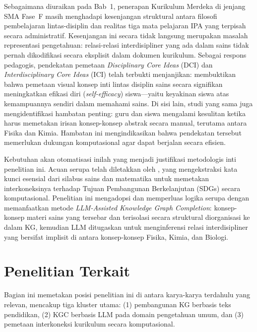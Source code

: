 \documentclass[../../thesis]{subfiles}
\begin{document}
Sebagaimana diuraikan pada Bab~1, penerapan Kurikulum Merdeka di jenjang
SMA Fase~F masih menghadapi kesenjangan struktural antara filosofi
pembelajaran lintas-disiplin dan realitas tiga mata pelajaran IPA yang
terpisah secara administratif. Kesenjangan ini secara tidak langsung
merupakan masalah representasi pengetahuan: relasi-relasi
interdisipliner yang ada dalam sains tidak pernah dikodifikasi secara
eksplisit dalam dokumen kurikulum. Sebagai respons pedagogis, pendekatan
pemetaan \textit{Disciplinary Core Ideas} (DCI) dan
\textit{Interdisciplinary Core Ideas} (ICI) telah terbukti menjanjikan:
\textcite{semilarski_expanding_2022} membuktikan bahwa pemetaan visual konsep inti
lintas disiplin sains secara signifikan meningkatkan efikasi diri
(\textit{self-efficacy}) siswa---yaitu keyakinan siswa atas kemampuannya
sendiri dalam memahami sains. Di sisi lain, studi yang sama juga
mengidentifikasi hambatan penting: guru dan siswa mengalami kesulitan
ketika harus memetakan irisan konsep-konsep abstrak secara manual,
terutama antara Fisika dan Kimia. Hambatan ini mengindikasikan bahwa
pendekatan tersebut memerlukan dukungan komputasional agar dapat berjalan
secara efisien.

Kebutuhan akan otomatisasi inilah yang menjadi justifikasi metodologis
inti penelitian ini. Acuan serupa telah diletakkan oleh
\textcite{said_mapping_2024}, yang mengekstraksi kata kunci esensial dari silabus sains dan
matematika untuk memetakan interkoneksinya terhadap Tujuan Pembangunan
Berkelanjutan (SDGs) secara komputasional. Penelitian ini mengadopsi dan
memperluas logika serupa dengan memanfaatkan metode \textit{LLM-Assisted
Knowledge Graph Completion}: konsep-konsep materi sains yang tersebar
dan terisolasi secara struktural diorganisasi ke dalam KG, kemudian LLM
ditugaskan untuk menginferensi relasi interdisipliner yang bersifat
implisit di antara konsep-konsep Fisika, Kimia, dan Biologi.

\section{Penelitian Terkait}\label{sec:penelitian-terkait}

Bagian ini memetakan posisi penelitian ini di antara karya-karya
terdahulu yang relevan, mencakup tiga kluster utama: (1) pembangunan KG
berbasis teks pendidikan, (2) KGC berbasis LLM pada domain pengetahuan
umum, dan (3) pemetaan interkoneksi kurikulum secara komputasional.
\end{document}
